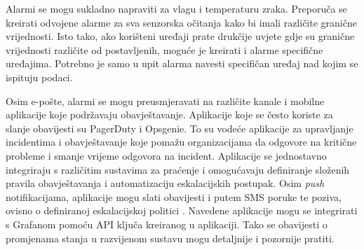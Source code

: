 Alarmi se mogu sukladno napraviti za vlagu i temperaturu zraka. Preporuča se kreirati odvojene alarme za sva senzorska očitanja kako bi imali različite granične vrijednosti. Isto tako, ako korišteni uređaji prate drukčije uvjete gdje su granične vrijednosti različite od postavljenih, moguće je kreirati i alarme specifične uređajima. Potrebno je samo u upit alarma navesti specifičan uređaj nad kojim se ispituju podaci. 

Osim e-pošte, alarmi se mogu preusmjeravati na različite kanale i mobilne aplikacije koje podržavaju obavještavanje. Aplikacije koje se često koriste za slanje obavijesti su PagerDuty i Opsgenie. To su vodeće aplikacije za upravljanje incidentima i obavještavanje koje pomažu organizacijama da odgovore na kritične probleme i smanje vrijeme odgovora na incident. Aplikacije se jednostavno integriraju s različitim sustavima za praćenje i omogućavaju definiranje složenih pravila obavještavanja i automatizaciju eskalacijskih postupak. Osim \textit{push} notifikacijama, aplikacije mogu slati obavijesti i putem SMS poruke te poziva, ovisno o definiranoj eskalacijskoj politici \cite{pagerduty_vs_opsgenie}. Navedene aplikacije mogu se integrirati s Grafanom pomoću API ključa kreiranog u aplikaciji. Tako se obavijesti o promjenama stanja u razvijenom sustavu mogu detaljnije i pozornije pratiti. 

\eject